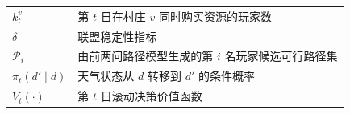 \begin{table}[H]
\begin{tabularx}{\textwidth}{
  >{\centering\arraybackslash}X  %
  >{\centering\arraybackslash}p{}  %
  }
$k_t^{v}$ & 第 $t$ 日在村庄 $v$ 同时购买资源的玩家数 \\

$\delta$ & 联盟稳定性指标 \\

$\mathcal P_i$ & 由前两问路径模型生成的第 $i$ 名玩家候选可行路径集 \\

$\pi_t(d'\mid d)$ & 天气状态从 $d$ 转移到 $d'$ 的条件概率 \\

$V_t(\cdot)$ & 第 $t$ 日滚动决策价值函数 \\
    \midrule

    \bottomrule[1.5pt]  %
\end{tabularx}
\end{table}
